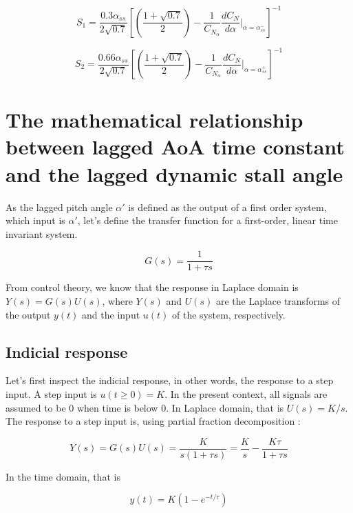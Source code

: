 \begin{equation}
S_1 = \frac{0.3\alpha_{ss}}{2\sqrt{0.7}}\left[\left(\frac{1+\sqrt{0.7}}{2}\right)-\frac{1}{C_{N_\alpha}}\frac{dC_N}{d\alpha}\Big|_{\alpha=\alpha_{ss}^{-}}\right]^{-1}
\end{equation}

\begin{equation}
S_2 = \frac{0.66\alpha_{ss}}{2\sqrt{0.7}}\left[\left(\frac{1+\sqrt{0.7}}{2}\right)-\frac{1}{C_{N_\alpha}}\frac{dC_N}{d\alpha}\Big|_{\alpha=\alpha_{ss}^{+}}\right]^{-1}
\end{equation}

\section{The mathematical relationship between lagged AoA time constant and the lagged dynamic stall angle}

As the lagged pitch angle $\alpha'$ is defined as the output of a first order system, which input is $\alpha'$, let's define the transfer function for a first-order, linear time invariant system. 

\begin{equation}
G(s) = \frac{1}{1+\tau s}
\end{equation}

\noindent From control theory, we know that the response in Laplace domain is $Y(s) = G(s)U(s)$, where $Y(s)$ and $U(s)$ are the Laplace transforms of the output $y(t)$ and the input $u(t)$ of the system, respectively.

\subsection{Indicial response}

Let's first inspect the indicial response, in other words, the response to a step input. A step input is $u(t \geq 0) = K$. In the present context, all signals are assumed to be $0$ when time is below 0. In Laplace domain, that is $U(s) = K/s$. The response to a step input is, using partial fraction decomposition : 

\begin{equation}
Y(s) = G(s)U(s) = \frac{K}{s(1+\tau s)} =\frac{K}{s} - \frac{K\tau}{1+\tau s}
\end{equation}

\noindent In the time domain, that is 

\begin{equation}
y(t) = K(1-e^{-t/\tau})
\end{equation}


